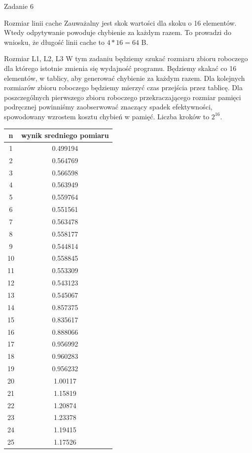 \documentclass[11pt,wide]{mwart}
\begin{document}
\begin{section}{Zadanie 6}
\begin{subsection}{Rozmiar linii cache}
Zauważalny jest skok wartości dla skoku o 16 elementów. Wtedy odpytywanie powoduje chybienie za każdym razem. To prowadzi do wniosku, że długość linii cache to \(4*16 = 64\) B.

\end{subsection}

\begin{subsection}{Rozmiar L1, L2, L3}
W tym zadaniu będziemy szukać rozmiaru zbioru roboczego dla którego istotnie zmienia się wydajność programu. Będziemy skakać co 16 elementów, w tablicy, aby generować chybienie za każdym razem. Dla kolejnych rozmiarów zbioru roboczego będziemy mierzyć czas przejścia przez tablicę. Dla poszczególnych pierwszego zbioru roboczego przekraczającego rozmiar pamięci podręcznej powinniśmy zaobserwować znaczący spadek efektywności, spowodowany wzrostem kosztu chybień w pamięć. Liczba kroków to \(2^{16}\). 
\begin{center}
\begin{tabular}{|c|c|}
\hline
n & wynik sredniego pomiaru \\
\hline
1 & 0.499194\\
\hline
2 & 0.564769\\
\hline
3 & 0.566598\\
\hline
4 & 0.563949\\
\hline
5 & 0.559764\\
\hline
6 & 0.551561\\
\hline
7 & 0.563478\\
\hline
8 & 0.558177\\
\hline
9 & 0.544814\\
\hline
10 & 0.558845\\
\hline
11 & 0.553309\\
\hline
12 & 0.543123\\
\hline
13 & 0.545067\\
\hline
14 & 0.857375\\
\hline
15 & 0.835617\\
\hline
16 & 0.888066\\
\hline
17 & 0.956992\\
\hline
18 & 0.960283\\
\hline
19 & 0.956232\\
\hline
20 & 1.00117\\
\hline
21 & 1.15819\\
\hline
22 & 1.20874\\
\hline
23 & 1.23378\\
\hline
24 & 1.19415\\
\hline
25 & 1.17526\\
\hline
\end{tabular}


\end{center}
\end{subsection}
\end{section}
\end{document}
